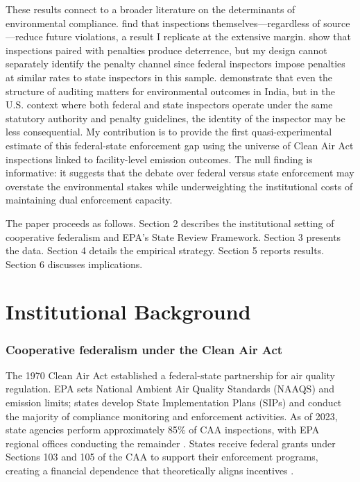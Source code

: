 \documentclass[12pt]{article}
\begin{document}
These results connect to a broader literature on the determinants of environmental compliance. \citet{gray2005compliance} find that inspections themselves---regardless of source---reduce future violations, a result I replicate at the extensive margin. \citet{shimshack2007enforce} show that inspections paired with penalties produce deterrence, but my design cannot separately identify the penalty channel since federal inspectors impose penalties at similar rates to state inspectors in this sample. \citet{duflo2013truth} demonstrate that even the structure of auditing matters for environmental outcomes in India, but in the U.S. context where both federal and state inspectors operate under the same statutory authority and penalty guidelines, the identity of the inspector may be less consequential. My contribution is to provide the first quasi-experimental estimate of this federal-state enforcement gap using the universe of Clean Air Act inspections linked to facility-level emission outcomes. The null finding is informative: it suggests that the debate over federal versus state enforcement \citep{adler2005judicial, glicksman2010federal} may overstate the environmental stakes while underweighting the institutional costs of maintaining dual enforcement capacity.

The paper proceeds as follows. Section 2 describes the institutional setting of cooperative federalism and EPA's State Review Framework. Section 3 presents the data. Section 4 details the empirical strategy. Section 5 reports results. Section 6 discusses implications.


\section{Institutional Background}

\subsubsection*{Cooperative federalism under the Clean Air Act} The 1970 Clean Air Act established a federal-state partnership for air quality regulation. EPA sets National Ambient Air Quality Standards (NAAQS) and emission limits; states develop State Implementation Plans (SIPs) and conduct the majority of compliance monitoring and enforcement activities. As of 2023, state agencies perform approximately 85\% of CAA inspections, with EPA regional offices conducting the remainder \citep{epa2023enforcement}. States receive federal grants under Sections 103 and 105 of the CAA to support their enforcement programs, creating a financial dependence that theoretically aligns incentives \citep{engel2006harnessing}.
\end{document}
